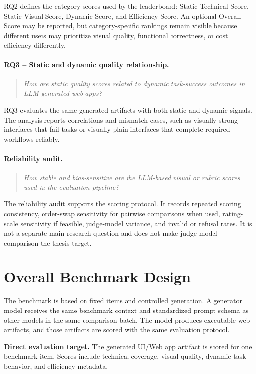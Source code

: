 RQ2 defines the category scores used by the leaderboard: Static Technical
Score, Static Visual Score, Dynamic Score, and Efficiency Score. An optional
Overall Score may be reported, but category-specific rankings remain visible
because different users may prioritize visual quality, functional correctness,
or cost efficiency differently.

\paragraph{RQ3 -- Static and dynamic quality relationship.}
\begin{quote}
\textit{How are static quality scores related to dynamic task-success outcomes
in LLM-generated web apps?}
\end{quote}

RQ3 evaluates the same generated artifacts with both static and dynamic
signals. The analysis reports correlations and mismatch cases, such as visually
strong interfaces that fail tasks or visually plain interfaces that complete
required workflows reliably.

\paragraph{Reliability audit.}
\begin{quote}
\textit{How stable and bias-sensitive are the LLM-based visual or rubric scores
used in the evaluation pipeline?}
\end{quote}

The reliability audit supports the scoring protocol. It records repeated
scoring consistency, order-swap sensitivity for pairwise comparisons when used,
rating-scale sensitivity if feasible, judge-model variance, and invalid or
refusal rates. It is not a separate main research question and does not make
judge-model comparison the thesis target.

\section{Overall Benchmark Design}
\label{sec:design}

The benchmark is based on fixed items and controlled generation. A generator
model receives the same benchmark context and standardized prompt schema as
other models in the same comparison batch. The model produces executable web
artifacts, and those artifacts are scored with the same evaluation protocol.

\textbf{Direct evaluation target.} The generated UI/Web app artifact is scored
for one benchmark item. Scores include technical coverage, visual quality,
dynamic task behavior, and efficiency metadata.

